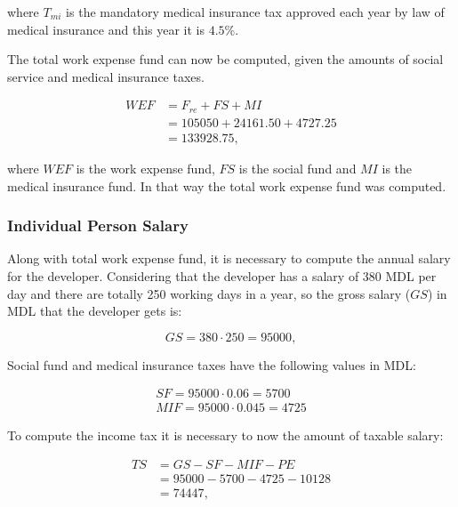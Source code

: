 \noindent where $T_{mi}$ is the mandatory medical insurance tax approved each
year by law of medical insurance and this year it is $4.5\%$.

\newpage

The total work expense fund can now be computed, given the amounts of social
service and medical insurance taxes.

\begin{equation}
\begin{split}
 WEF &= F_{re} + FS + MI\\
     &= 105050 + 24161.50 + 4727.25\\
     &= 133928.75,
\end{split}
\end{equation}

\noindent where $WEF$ is the work expense fund, $FS$ is the social fund and $MI$
is the medical insurance fund. In that way the total work expense fund was
computed.


\subsubsection{Individual Person Salary}

Along with total work expense fund, it is necessary to compute the annual
salary for the developer. Considering that the developer has a salary of 380
MDL per day and there are totally 250 working days in a year, so the gross
salary ($GS$) in MDL that the developer gets is:

\begin{equation}
GS = 380 \cdot 250 = 95000,
\end{equation}

Social fund and medical insurance taxes have the following values in MDL:

\begin{equation}
\begin{split}
SF = 95000 \cdot 0.06 = 5700\\
MIF = 95000 \cdot 0.045 = 4725
\end{split}
\end{equation}

To compute the income tax it is necessary to now the amount of taxable salary:

\begin{equation}
\begin{split}
 TS &= GS - SF - MIF - PE \\
              &= 95000 - 5700 - 4725 - 10128\\
              &= 74447,
\end{split}
\end{equation}

